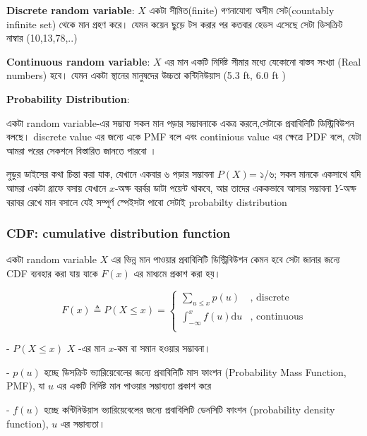 \documentclass[graybox, envcountchap, twocolumn]{styles/svmult}
\begin{document}
{\bengalifont
\textbf{Discrete random variable}: $X$ একটা সীমিত(finite) গণনাযোগ্য অসীম সেট(countably infinite set) থেকে মান গ্রহণ করে। যেমন কয়েন ছুড়ে টস করার পর কতবার হেডস এসেছে সেটা ডিসক্রিট নাম্বার (10,13,78,..)


\textbf{Continuous random variable}:  $X$ এর মান একটি নির্দিষ্ট সীমার মধ্যে যেকোনো বাস্তব সংখ্যা (Real numbers) হবে। যেমন একটা স্থানের মানুষদের উচ্চতা কন্টিনিউয়াস (5.3 ft, 6.0 ft )}

\textbf{Probability Distribution}: {\bengalifont একটা random variable-এর সম্ভাব্য সকল মান পড়ার সম্ভাবনাকে একত্র করলে,সেটাকে প্রবাবিলিটি ডিস্ট্রিবিউশন বলছে। discrete value এর জন্যে একে PMF বলে এবং continious value এর ক্ষেত্রে PDF বলে, যেটা আমরা পরের সেকশনে বিস্তারিত জানতে পারবো ।

লুডুর ডাইসের কথা চিন্তা করা যাক, যেখানে একবার ৬ পড়ার সম্ভাবনা $P(X)$= ১/৬; সকল মানকে একসাথে যদি আমরা একটা গ্রাফে বসায় যেখানে $x$-অক্ষ বরর্বর ডাটা পয়েন্ট থাকবে, আর তাদের এককভাবে আসার সম্ভাবনা $Y$-অক্ষ বরাবর রেখে মান বসালে যেই সম্পূর্ণ স্পেইসটা পাবো সেটাই probabilty distribution }

\subsubsection{CDF: cumulative distribution function}
{\bengalifont একটা random variable} $X$ {\bengalifont এর ভিন্ন মান পাওয়ার প্রবাবিলিটি ডিস্ট্রিবিউশন কেমন হবে সেটা জানার জন্যে CDF ব্যবহার করা যায় যাকে} $𝐹(𝑥)$ {\bengalifont এর মাধ্যমে প্রকাশ করা হয়। }

\begin{equation}
F(x) \triangleq P(X \leq x)=\begin{cases}
\sum_{u \leq x}p(u) & \text{, discrete}\\
\int_{-\infty}^{x} f(u)\mathrm{d}u & \text{, continuous}\\
\end{cases}
\end{equation}


- $  P(X \leq x) $ $X$ -{\bengalifont এর মান} $x$-{ কম বা সমান হওয়ার সম্ভাবনা।}

- $p(u)$ {\bengalifont হচ্ছে ডিসক্রিট ভ্যারিয়েবেলের জন্যে  প্রবাবিলিটি মাস ফাংশন (Probability Mass Function, PMF), যা $u$ এর একটি নির্দিষ্ট মান পাওয়ার সম্ভাব্যতা প্রকাশ করে }

- $ f(u)$ {\bengalifont হচ্ছে কন্টিনিউয়াস ভ্যারিয়েবেলের জন্যে প্রবাবিলিটি ডেনসিটি ফাংশন (probability density function), $u$ এর সম্ভাব্যতা। } 
\end{document}
